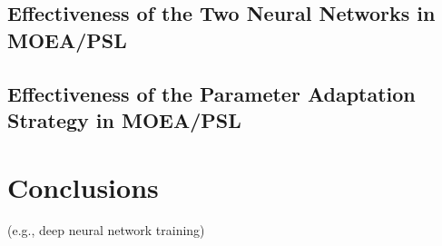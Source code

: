 \documentclass[journal]{IEEEtran}
\begin{document}
\subsection{Effectiveness of the Two Neural Networks in MOEA/PSL}\label{sec:twoNNs}

\subsection{Effectiveness of the Parameter Adaptation Strategy in MOEA/PSL}

\section{Conclusions}


 (e.g., deep neural network training)

\ifCLASSOPTIONcaptionsoff
  \newpage
\fi




\end{document}
